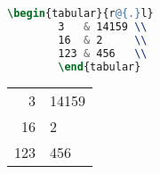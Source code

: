 \begin{enumerate}
\begin{figure}[!hpbt]
\begin{minipage}{0.5\textwidth}
\begin{lstlisting}[language=tex]
        \begin{tabular}{r@{.}l}
        3   & 14159 \\
        16  & 2     \\
        123 & 456   \\
        \end{tabular}
        \end{lstlisting}%
        \end{minipage}
        \begin{minipage}{0.45\textwidth}
        \centering
        \begin{tabular}{r@{.}l}
        3   & 14159 \\
        16  & 2     \\
        123 & 456   \\
        \end{tabular}
        \end{minipage}
    \end{figure}


\end{enumerate}
